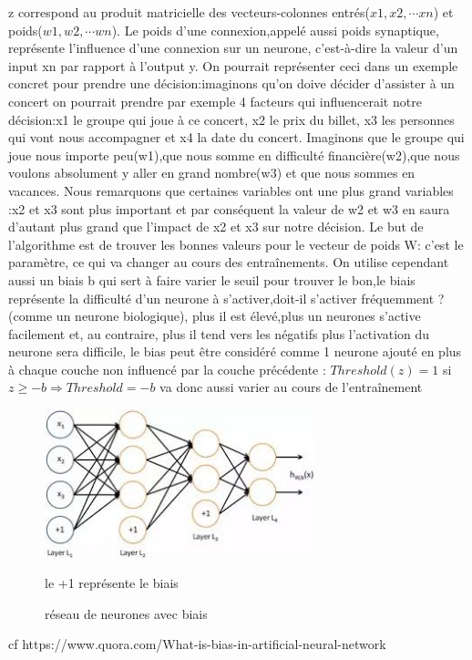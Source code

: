 \documentclass[openany,14pt,fleqn]{book} %
\begin{document}
z correspond au produit matricielle des vecteurs-colonnes entrés($x1,x2,\cdots xn$) et poids($w1,w2,\cdots wn$). Le poids d'une connexion,appelé aussi poids synaptique, représente l'influence d'une connexion sur un neurone, c'est-à-dire la valeur d'un input xn par rapport à l'output y. On pourrait représenter ceci dans un exemple concret pour prendre une décision:imaginons qu'on doive décider d’assister à un concert on pourrait prendre par exemple 4 facteurs qui influencerait notre décision:x1 le groupe qui joue à ce concert, x2 le prix du billet, x3 les personnes qui vont nous accompagner et x4 la date du concert. Imaginons que le groupe qui joue nous importe peu(w1),que nous somme en difficulté financière(w2),que nous voulons absolument y aller en grand nombre(w3) et que nous sommes en vacances. Nous remarquons que certaines variables ont une plus grand variables :x2 et x3 sont plus important et par conséquent la valeur de w2 et w3 en saura d'autant plus grand que l'impact de x2 et x3 sur notre décision.\newline\smallbreak 
Le but de l’algorithme est de trouver les bonnes valeurs pour le vecteur de poids W: c'est le paramètre, ce qui va changer au cours des entraînements.
On utilise cependant aussi un biais b qui sert à faire varier le seuil pour trouver le bon,le biais représente la difficulté d'un neurone à s'activer,doit-il s'activer fréquemment ?(comme un neurone biologique), plus il est élevé,plus un neurones s'active facilement et, au contraire, plus il tend vers les négatifs plus l'activation du neurone sera difficile, le bias peut être considéré comme 1 neurone ajouté en plus à chaque couche non influencé par la couche précédente : \newline
$Threshold(z)=1$ si $z\geq-b\Rightarrow Threshold = -b$ va donc aussi varier au cours de l'entraînement
\begin{figure}[h]
\includegraphics[width=0.7\textwidth]{Pictures/biais.jpg}
\caption{réseau de neurones avec biais}
\begin{remark} le +1 représente le biais
\end{remark}
\end{figure} cf https://www.quora.com/What-is-bias-in-artificial-neural-network
\end{document}
